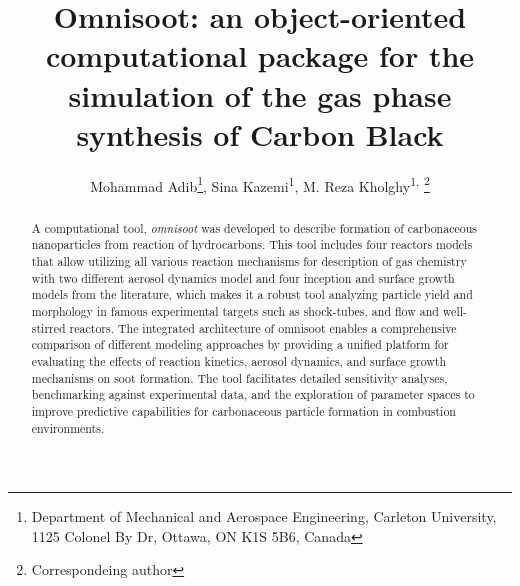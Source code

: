 	\title{\renewcommand\baselinestretch{1}\bf
		Omnisoot: an object-oriented computational package for the simulation of the gas phase synthesis of Carbon Black
		}
	\renewcommand\baselinestretch{0.8}
	\author{
	Mohammad Adib\footnote{\scriptsize{Department of Mechanical and Aerospace Engineering, Carleton University, 1125 Colonel By Dr, Ottawa, ON K1S 5B6, Canada}},
	Sina Kazemi\textsuperscript{1}{\vspace{0.4em}},  
	M. Reza Kholghy\textsuperscript{1, }\footnote{\scriptsize{Correspondeing author}} 
}
	\date{}
	\maketitle
	\renewcommand\baselinestretch{1.3}
	
	\begin{abstract}
	A computational tool, \textit{omnisoot} was developed to describe formation of carbonaceous nanoparticles from reaction of hydrocarbons. This tool includes four reactors models that allow utilizing all various reaction mechanisms for description of gas chemistry with two different aerosol dynamics model and four inception and surface growth models from the literature, which makes it a robust tool analyzing particle yield and morphology in famous experimental targets such as shock-tubes, and flow and well-stirred reactors. The integrated architecture of omnisoot enables a comprehensive comparison of different modeling approaches by providing a unified platform for evaluating the effects of reaction kinetics, aerosol dynamics, and surface growth mechanisms on soot formation. The tool facilitates detailed sensitivity analyses, benchmarking against experimental data, and the exploration of parameter spaces to improve predictive capabilities for carbonaceous particle formation in combustion environments.
		
	\end{abstract}
	